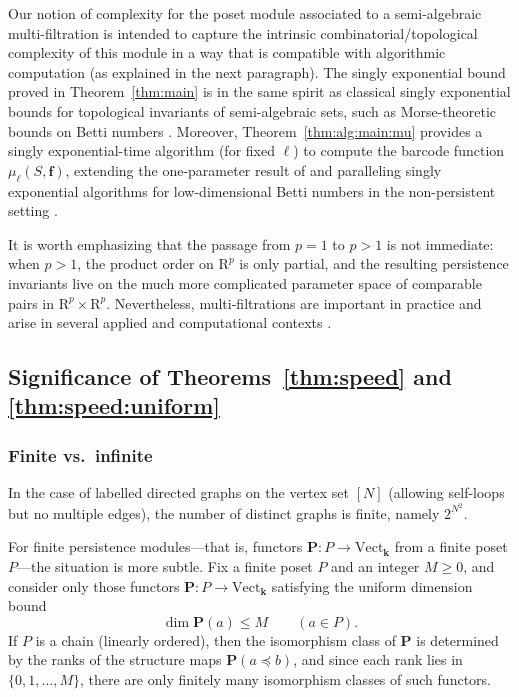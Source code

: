 \documentclass{amsart}[10pts]
\theoremstyle{definition}
\theoremstyle{remark}
\theoremstyle{observation}
\numberwithin{equation}{section}
\newcommand {\R} {\mathrm{R}}
\newcommand {\kk}         {\mathbf{k}}
\newcommand{\Vect}{\mathrm{Vect}}
\begin{document}
\medskip
Our notion of complexity for the poset module associated to a semi-algebraic multi-filtration is intended to capture the intrinsic combinatorial/topological complexity of this module in a way that is compatible with algorithmic computation (as explained in the next paragraph).
The singly exponential bound proved in Theorem~\ref{thm:main} is in the same spirit as classical singly exponential bounds for topological invariants of semi-algebraic sets, such as Morse-theoretic bounds on Betti numbers \cite{OP,T,Milnor2,GV07}. 
Moreover, Theorem~\ref{thm:alg:main:mu} provides a singly exponential-time algorithm (for fixed $\ell$) to compute the barcode function $\mu_\ell(S,\mathbf f)$, extending the one-parameter result of \cite{Basu-Karisani-2} and paralleling singly exponential algorithms for low-dimensional Betti numbers in the non-persistent setting \cite{Bas05-first,BPRbettione,Basu-Karisani-1}.

It is worth emphasizing that the passage from $p=1$ to $p>1$ is not immediate: when $p>1$, the product order on $\R^p$ is only partial, and the resulting persistence invariants live on the much more complicated parameter space of comparable pairs in $\R^p\times \R^p$. 
Nevertheless, multi-filtrations are important in practice and arise in several applied and computational contexts \cite{CZ2007,CSZ2010,SCLRO2017}.


\subsection{Significance of Theorems~\ref{thm:speed} and \ref{thm:speed:uniform}}
\label{subsec:significance:3-4}


\subsubsection{Finite vs.\ infinite}
In the case of labelled directed graphs on the vertex set $[N]$ (allowing self-loops but no multiple edges), the number of distinct graphs is finite, namely $2^{N^2}$.

For finite persistence modules---that is, functors $\mathbf P:P\to \Vect_{\kk}$ from a finite poset $P$---the situation is more subtle. Fix a finite poset $P$ and an integer $M\ge 0$, and consider only those functors $\mathbf P:P\to \Vect_{\kk}$ satisfying the uniform dimension bound
\begin{equation}
\label{eqn:M}
\dim \mathbf P(a)\le M \qquad (a\in P).
\end{equation}
If $P$ is a chain (linearly ordered), then the isomorphism class of $\mathbf P$ is determined by the ranks of the structure maps $\mathbf P(a\preceq b)$, and since each rank lies in $\{0,1,\ldots,M\}$, there are only finitely many isomorphism classes of such functors.
\end{document}
